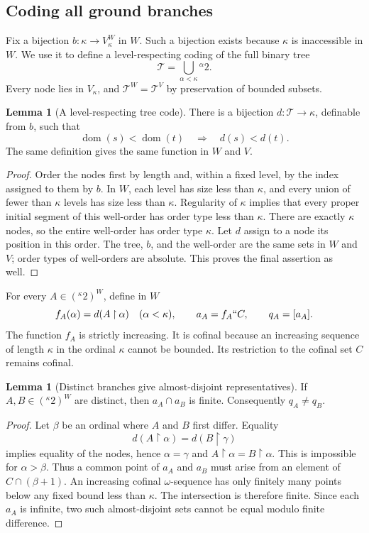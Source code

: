 \documentclass[11pt,letterpaper]{article}
\theoremstyle{definition}
\newtheorem{lemma}[definition]{Lemma}
\numberwithin{equation}{section}
\newcommand{\dom}{\operatorname{dom}}
\newcommand{\restr}{\mathbin{\upharpoonright}}
\begin{document}
\subsection{Coding all ground branches}

Fix a bijection $b:\kappa\to V_\kappa^W$ in $W$. Such a bijection exists because $\kappa$ is inaccessible in $W$. We use it to define a level-respecting coding of the full binary tree
\[
 \mathcal T=\bigcup_{\alpha<\kappa}{}^\alpha2.
\]
Every node lies in $V_\kappa$, and $\mathcal T^W=\mathcal T^V$ by preservation of bounded subsets.

\begin{lemma}[A level-respecting tree code]\label{lem:tree}
There is a bijection $d:\mathcal T\to\kappa$, definable from $b$, such that
\[
 \dom(s)<\dom(t)\quad\Longrightarrow\quad d(s)<d(t).
\]
The same definition gives the same function in $W$ and $V$.
\end{lemma}
\begin{proof}
Order the nodes first by length and, within a fixed level, by the index assigned to them by $b$. In $W$, each level has size less than $\kappa$, and every union of fewer than $\kappa$ levels has size less than $\kappa$. Regularity of $\kappa$ implies that every proper initial segment of this well-order has order type less than $\kappa$. There are exactly $\kappa$ nodes, so the entire well-order has order type $\kappa$. Let $d$ assign to a node its position in this order. The tree, $b$, and the well-order are the same sets in $W$ and $V$; order types of well-orders are absolute. This proves the final assertion as well.
\end{proof}

For every $A\in({}^\kappa2)^W$, define in $W$
\begin{equation}\label{eq:branch}
 f_A(\alpha)=d(A\restr\alpha)\quad(\alpha<\kappa),
 \qquad a_A=f_A``C,\qquad q_A=[a_A].
\end{equation}
The function $f_A$ is strictly increasing. It is cofinal because an increasing sequence of length $\kappa$ in the ordinal $\kappa$ cannot be bounded. Its restriction to the cofinal set $C$ remains cofinal.

\begin{lemma}[Distinct branches give almost-disjoint representatives]\label{lem:ad}
If $A,B\in({}^\kappa2)^W$ are distinct, then $a_A\cap a_B$ is finite. Consequently $q_A\neq q_B$.
\end{lemma}
\begin{proof}
Let $\beta$ be an ordinal where $A$ and $B$ first differ. Equality
\[
 d(A\restr\alpha)=d(B\restr\gamma)
\]
implies equality of the nodes, hence $\alpha=\gamma$ and $A\restr\alpha=B\restr\alpha$. This is impossible for $\alpha>\beta$. Thus a common point of $a_A$ and $a_B$ must arise from an element of $C\cap(\beta+1)$. An increasing cofinal $\omega$-sequence has only finitely many points below any fixed bound less than $\kappa$. The intersection is therefore finite. Since each $a_A$ is infinite, two such almost-disjoint sets cannot be equal modulo finite difference.
\end{proof}
\end{document}

